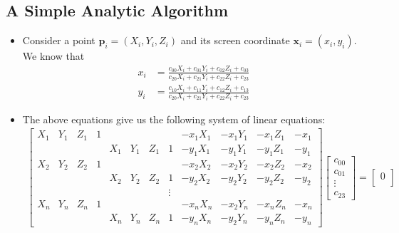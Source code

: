 \documentclass[10pt]{article}
\newcommand{\ve}[1]{\mathbf{#1}}
\begin{document}
  \subsection{A Simple Analytic Algorithm}
  
  \begin{itemize}
    \item Consider a point $\ve{p}_i = (X_i, Y_i, Z_i)$ and its screen coordinate
      $\ve{x}_i = (x_i, y_i)$. We know that
      \begin{align*}
        x_i &= \frac{ c_{00} X_i + c_{01} Y_i + c_{02} Z_i + c_{03} }{ c_{20} X_i + c_{21} Y_i + c_{22} Z_i + c_{23} }\\
        y_i &= \frac{ c_{10} X_i + c_{11} Y_i + c_{12} Z_i + c_{13} }{ c_{20} X_i + c_{21} Y_i + c_{22} Z_i + c_{23} }
      \end{align*}
    \item The above equations give us the following system of linear equations:      
      \begin{align*}
        \left[
        \begin{array}{cccccccccccc}
          X_1 & Y_1 & Z_1 & 1 &     &     &        &   & -x_1 X_1 & -x_1 Y_1 & -x_1 Z_1  & -x_1\\
              &     &     &   & X_1 & Y_1 & Z_1    & 1 & -y_1 X_1 & -y_1 Y_1 & -y_1 Z_1  & -y_1\\
          X_2 & Y_2 & Z_2 & 1 &     &     &        &   & -x_2 X_2 & -x_2 Y_2 & -x_2 Z_2  & -x_2\\
              &     &     &   & X_2 & Y_2 & Z_2    & 1 & -y_2 X_2 & -y_2 Y_2 & -y_2 Z_2  & -y_2\\
              &     &     &   &     &     &   & \vdots &          &          &           &    \\
          X_n & Y_n & Z_n & 1 &     &     &        &   & -x_n X_n & -x_2 Y_n & -x_n Z_n  & -x_n\\
              &     &     &   & X_n & Y_n & Z_n    & 1 & -y_n X_n & -y_2 Y_n & -y_n Z_n  & -y_n              
        \end{array}
        \right]
        \begin{bmatrix}
          c_{00} \\
          c_{01} \\
          \vdots \\
          c_{23}
        \end{bmatrix}
        =
        \begin{bmatrix}
          0\\

\end{bmatrix}
\end{align*}
\end{itemize}
\end{document}
